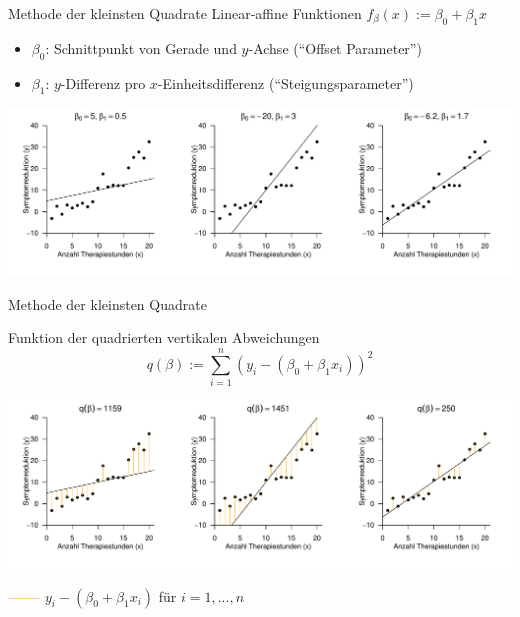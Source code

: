 \documentclass[
  8pt,
  ignorenonframetext,
]{beamer}
\providecommand{\tightlist}{%
  \setlength{\itemsep}{0pt}\setlength{\parskip}{0pt}}
\begin{document}
\begin{frame}{Methode der kleinsten Quadrate}
\protect\hypertarget{methode-der-kleinsten-quadrate-4}{}
Linear-affine Funktionen \(f_\beta(x) := \beta_0 + \beta_1 x\)

\small

\begin{itemize}
\tightlist
\item
  \(\beta_0\): Schnittpunkt von Gerade und \(y\)-Achse (``Offset
  Parameter'')
\item
  \(\beta_1\): \(y\)-Differenz pro \(x\)-Einheitsdifferenz
  (``Steigungsparameter'')
\end{itemize}

\vspace{1cm}

\begin{center}\includegraphics[width=1\linewidth]{1_Abbildungen/alm_1_ausgleichsgerade_1} \end{center}
\end{frame}

\begin{frame}{Methode der kleinsten Quadrate}
\protect\hypertarget{methode-der-kleinsten-quadrate-5}{}
\small

Funktion der quadrierten vertikalen Abweichungen \begin{equation}
q(\beta) := \sum_{i=1}^n (y_i - (\beta_0 + \beta_1x_i))^2
\end{equation}

\begin{center}\includegraphics[width=1\linewidth]{1_Abbildungen/alm_1_ausgleichsgerade_2} \end{center}
\center

\textcolor{orange}{\textbf{------}} \(y_i - (\beta_0 + \beta_1x_i)\) für
\(i = 1,...,n\)
\end{frame}
\end{document}
